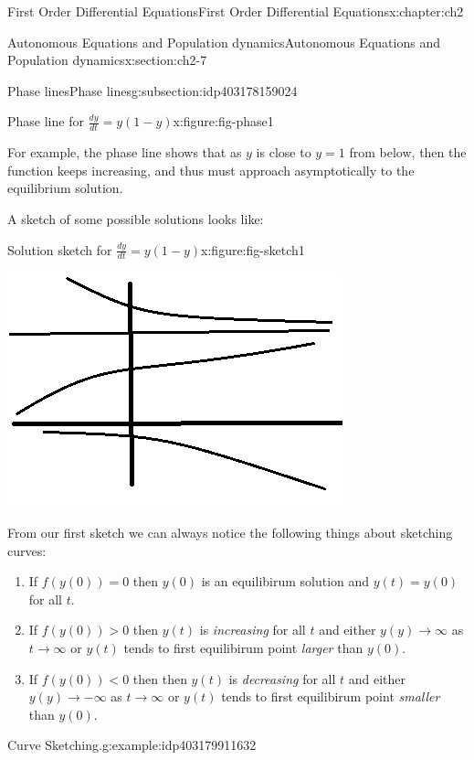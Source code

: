 \documentclass[oneside,10pt,]{book}
\numberwithin{equation}{section}
\numberwithin{equation}{section}
\newcommand{\lt}{<}
\begin{document}
\begin{chapterptx}{First Order Differential Equations}{}{First Order Differential Equations}{}{}{x:chapter:ch2}
\begin{sectionptx}{Autonomous Equations and Population dynamics}{}{Autonomous Equations and Population dynamics}{}{}{x:section:ch2-7}
\begin{subsectionptx}{Phase lines}{}{Phase lines}{}{}{g:subsection:idp403178159024}
\begin{figureptx}{Phase line for \(\frac{dy}{dt} = y(1-y)\)}{x:figure:fig-phase1}{}
\begin{image}{0.35}{0.3}{0.35}
\end{image}%
\tcblower
\end{figureptx}%
For example, the phase line shows that as \(y\) is close to \(y=1\) from below, then the function keeps increasing, and thus must approach asymptotically to the equilibrium solution.%
\par
A sketch of some possible solutions looks like: \begin{figureptx}{Solution sketch for \(\frac{dy}{dt} = y(1-y)\)}{x:figure:fig-sketch1}{}%
\begin{image}{0.3}{0.4}{0.3}%
\includegraphics[width=\linewidth]{images/1-6-Sketch1.png}
\end{image}%
\tcblower
\end{figureptx}%
%
\par
From our first sketch we can always notice the following things about sketching curves:%
%
\begin{enumerate}
\item{}If \(f(y(0))=0\) then \(y(0)\) is an equilibirum solution and \(y(t)=y(0)\) for all \(t\).%
\item{}If \(f(y(0))>0\) then \(y(t)\) is \emph{increasing} for all \(t\) and either \(y(y)\to\infty\) as \(t\to\infty\) or \(y(t)\) tends to first equilibirum point \emph{larger} than \(y(0).\)%
\item{}If \(f(y(0))
\lt 0\) then then \(y(t)\) is \emph{decreasing} for all \(t\) and either \(y(y)\to-\infty\) as \(t\to\infty\) or \(y(t)\) tends to first equilibirum point \emph{smaller} than \(y(0).\)%
\end{enumerate}
\begin{example}{Curve Sketching.}{g:example:idp403179911632}%

\end{example}
\end{subsectionptx}
\end{sectionptx}
\end{chapterptx}
\end{document}
